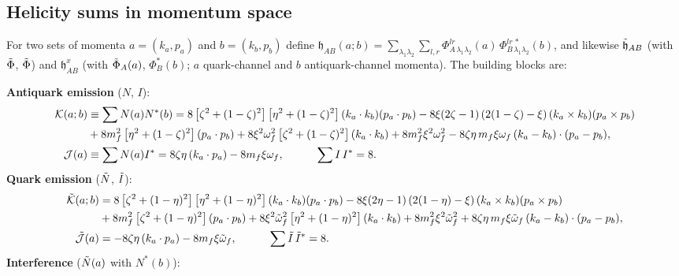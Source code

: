 \documentclass[9pt]{article}
\numberwithin{equation}{section}
\begin{document}
\subsection{Helicity sums in momentum space}
For two sets of momenta $a=(k_{a},p_{a})$ and $b=(k_{b},p_{b})$ define $\mathfrak{h}_{AB}(a;b)=\sum_{\lambda_{1}\lambda_{2}}\sum_{l,r}\Phi^{lr}_{A\,\lambda_{1}\lambda_{2}}(a)\,\Phi^{lr\,*}_{B\,\lambda_{1}\lambda_{2}}(b)$, and likewise $\Tilde{\mathfrak{h}}_{AB}$ (with $\Tilde{\Phi}$, $\Tilde{\Phi}$) and $\mathfrak{h}^{x}_{AB}$ (with $\Tilde{\Phi}_{A}(a)$, $\Phi^{*}_{B}(b)$; $a$ quark-channel and $b$ antiquark-channel momenta). The building blocks are:

\noindent\textbf{Antiquark emission} ($N$, $I$):
\begin{align}\label{eq:Kqb}
    \mathcal{K}(a;b) & \equiv\sum N(a)N^{*}(b) = 8\left[\zeta^{2}+(1-\zeta)^{2}\right]\left[\eta^{2}+(1-\zeta)^{2}\right](k_{a}\cdot k_{b})(p_{a}\cdot p_{b})-8\xi(2\zeta-1)\left(2(1-\zeta)-\xi\right)(k_{a}\times k_{b})(p_{a}\times p_{b})\notag \\
    & + 8m^{2}_{f}\left[\eta^{2}+(1-\zeta)^{2}\right](p_{a}\cdot p_{b}) + 8\xi^{2}\omega^{2}_{f}\left[\zeta^{2}+(1-\zeta)^{2}\right](k_{a}\cdot k_{b}) + 8m^{2}_{f}\xi^{2}\omega^{2}_{f} - 8\zeta\eta\,m_{f}\xi\omega_{f}\,(k_{a}-k_{b})\cdot(p_{a}-p_{b}),\notag \\
    \mathcal{J}(a) & \equiv\sum N(a)I^{*} = 8\zeta\eta\,(k_{a}\cdot p_{a})-8m_{f}\xi\omega_{f},\hspace{3em}\sum I\,I^{*}=8 .
\end{align}
\textbf{Quark emission} ($\Tilde{N}$, $\Tilde{I}$):
\begin{align}\label{eq:Kq}
    \Tilde{\mathcal{K}}(a;b) & = 8\left[\zeta^{2}+(1-\eta)^{2}\right]\left[\eta^{2}+(1-\eta)^{2}\right](k_{a}\cdot k_{b})(p_{a}\cdot p_{b})-8\xi(2\eta-1)\left(2(1-\eta)-\xi\right)(k_{a}\times k_{b})(p_{a}\times p_{b})\notag \\
    & + 8m^{2}_{f}\left[\zeta^{2}+(1-\eta)^{2}\right](p_{a}\cdot p_{b}) + 8\xi^{2}\Tilde{\omega}^{2}_{f}\left[\eta^{2}+(1-\eta)^{2}\right](k_{a}\cdot k_{b}) + 8m^{2}_{f}\xi^{2}\Tilde{\omega}^{2}_{f} + 8\zeta\eta\,m_{f}\xi\Tilde{\omega}_{f}\,(k_{a}-k_{b})\cdot(p_{a}-p_{b}),\notag \\
    \Tilde{\mathcal{J}}(a) & = -8\zeta\eta\,(k_{a}\cdot p_{a})-8m_{f}\xi\Tilde{\omega}_{f},\hspace{3em}\sum\Tilde{I}\,\Tilde{I}^{*}=8 .
\end{align}
\textbf{Interference} ($\Tilde{N}(a)$ with $N^{*}(b)$):
\end{document}
